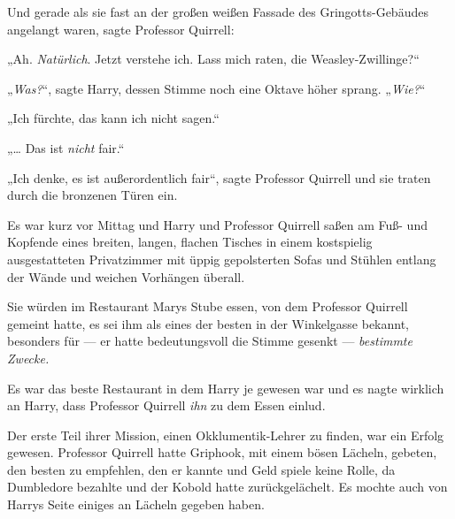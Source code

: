 Und gerade als sie fast an der großen weißen Fassade des Gringotts-Gebäudes angelangt waren, sagte Professor Quirrell:

„Ah. \emph{Natürlich}. Jetzt verstehe ich. Lass mich raten, die Weasley-Zwillinge?“

„\emph{Was?}“, sagte Harry, dessen Stimme noch eine Oktave höher sprang.
„\emph{Wie?}“

„Ich fürchte, das kann ich nicht sagen.“

„… Das ist \emph{nicht} fair.“

„Ich denke, es ist außerordentlich fair“, sagte Professor Quirrell und sie traten durch die bronzenen Türen ein.

\later

Es war kurz vor Mittag und Harry und Professor Quirrell saßen am Fuß- und Kopfende eines breiten, langen, flachen Tisches in einem kostspielig ausgestatteten Privatzimmer mit üppig gepolsterten Sofas und Stühlen entlang der Wände und weichen Vorhängen überall.

Sie würden im Restaurant Marys Stube essen, von dem Professor Quirrell gemeint hatte, es sei ihm als eines der besten in der Winkelgasse bekannt, besonders für — er hatte bedeutungsvoll die Stimme gesenkt — \emph{bestimmte Zwecke.}

Es war das beste Restaurant in dem Harry je gewesen war und es nagte wirklich an Harry, dass Professor Quirrell \emph{ihn} zu dem Essen einlud.

Der erste Teil ihrer Mission, einen Okklumentik-Lehrer zu finden, war ein Erfolg gewesen. Professor Quirrell hatte Griphook, mit einem bösen Lächeln, gebeten, den besten zu empfehlen, den er kannte und Geld spiele keine Rolle, da Dumbledore bezahlte und der Kobold hatte zurückgelächelt. Es mochte auch von Harrys Seite einiges an Lächeln gegeben haben.

